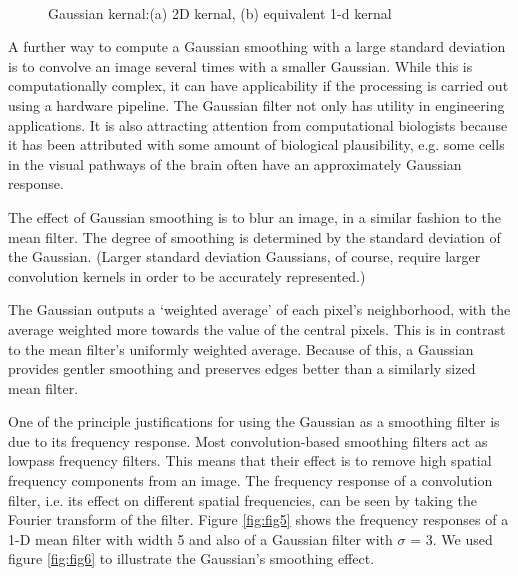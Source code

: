\begin{figure}[h]
\begin{dBox}
\centering
  \mbox{
   }
   \caption{Gaussian kernal:(a) 2D kernal, (b) equivalent 1-d kernal \label{fig:fig4} }   
\end{dBox}   
\end{figure}


\bigskip
A further way to compute a Gaussian smoothing with a large 
standard deviation is to convolve an image several times with a 
smaller Gaussian. While this is computationally complex, it can have applicability if the processing 
is carried out using a hardware pipeline. 
\bigskip
The Gaussian filter not only has utility in engineering applications. It is also attracting attention 
from computational biologists because it has been attributed with some amount of biological 
plausibility, e.g. some cells in the visual pathways of the brain often have an approximately 
Gaussian response.

\bigskip
The effect of Gaussian smoothing is to blur an image, in a similar fashion to the mean filter. The 
degree of smoothing is determined by the standard deviation of the Gaussian. (Larger standard 
deviation Gaussians, of course, require larger convolution kernels in order to be accurately 
represented.) 

\bigskip
The Gaussian outputs a `weighted average' of each pixel's neighborhood, with the average 
weighted more towards the value of the central pixels. This is in contrast to the mean filter's 
uniformly weighted average. Because of this, a Gaussian provides gentler smoothing and 
preserves edges better than a similarly sized mean filter. 
\bigskip

One of the principle justifications for using 
the Gaussian as a smoothing filter is due 
to its frequency response. Most 
convolution-based smoothing filters act as 
lowpass frequency filters. This means that 
their effect is to remove high spatial 
frequency components from an image. The 
frequency response of a convolution 
filter, i.e. its effect on different spatial 
frequencies, can be seen by taking the 
Fourier transform of the filter. Figure \ref{fig:fig5}
shows the frequency responses of a 1-D mean filter with width 5 and also of a Gaussian filter 
with $\sigma$ = 3. We used figure \ref{fig:fig6} to illustrate the Gaussian's smoothing effect.

